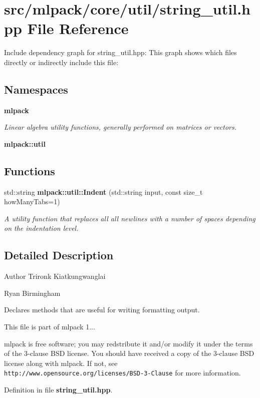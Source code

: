 \section{src/mlpack/core/util/string\-\_\-util.hpp File Reference}
\label{string__util_8hpp}
Include dependency graph for string\-\_\-util.\-hpp\-:
This graph shows which files directly or indirectly include this file\-:
\subsection*{Namespaces}
\begin{DoxyCompactItemize}
\item 
{\bf mlpack}
\begin{DoxyCompactList}\small\item\em Linear algebra utility functions, generally performed on matrices or vectors. \end{DoxyCompactList}\item 
{\bf mlpack\-::util}
\end{DoxyCompactItemize}
\subsection*{Functions}
\begin{DoxyCompactItemize}
\item 
std\-::string {\bf mlpack\-::util\-::\-Indent} (std\-::string input, const size\-\_\-t how\-Many\-Tabs=1)
\begin{DoxyCompactList}\small\item\em A utility function that replaces all all newlines with a number of spaces depending on the indentation level. \end{DoxyCompactList}\end{DoxyCompactItemize}


\subsection{Detailed Description}
\begin{DoxyAuthor}{Author}
Trironk Kiatkungwanglai 

Ryan Birmingham
\end{DoxyAuthor}
Declares methods that are useful for writing formatting output.

This file is part of mlpack 1...

mlpack is free software; you may redstribute it and/or modify it under the terms of the 3-\/clause B\-S\-D license. You should have received a copy of the 3-\/clause B\-S\-D license along with mlpack. If not, see {\tt http\-://www.\-opensource.\-org/licenses/\-B\-S\-D-\/3-\/\-Clause} for more information. 

Definition in file {\bf string\-\_\-util.\-hpp}.

